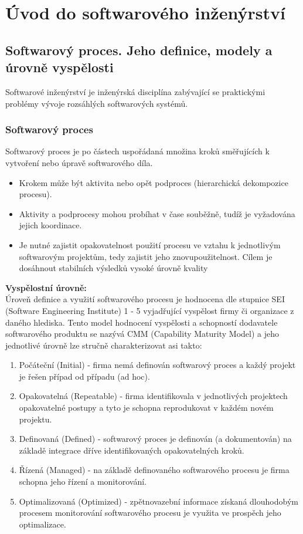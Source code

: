 \section{Úvod do softwarového inženýrství}
\subsection{Softwarový proces. Jeho definice, modely a úrovně vyspělosti}
Softwarové inženýrství je inženýrská disciplína zabývající se praktickými problémy vývoje rozsáhlých softwarových systémů.

\subsubsection{Softwarový proces}
Softwarový proces je po částech uspořádaná množina kroků směřujících k vytvoření nebo úpravě softwarového díla.
\begin{itemize}
\item Krokem může být aktivita nebo opět podproces (hierarchická dekompozice procesu). 
\item Aktivity a podprocesy mohou probíhat v čase souběžně, tudíž je vyžadována jejich koordinace. 
\item Je nutné zajistit opakovatelnost použití procesu ve vztahu k jednotlivým softwarovým projektům, tedy zajistit jeho znovupoužitelnost.  Cílem je dosáhnout stabilních výsledků vysoké úrovně kvality
\end{itemize}

\textbf{Vyspělostní úrovně:}\\
Úroveň definice a využití softwarového procesu je hodnocena dle stupnice SEI (Software Engineering Institute) 1 - 5 vyjadřující vyspělost firmy či organizace z daného hlediska. Tento model hodnocení vyspělosti a schopností dodavatele softwarového produktu se nazývá CMM (Capability Maturity Model) a jeho jednotlivé úrovně lze stručně charakterizovat asi takto:
\begin{enumerate}
\item Počáteční (Initial) - firma nemá definován softwarový proces a každý projekt je řešen případ od případu (ad hoc).
\item Opakovatelná (Repeatable) - firma identifikovala v jednotlivých projektech opakovatelné postupy a tyto je schopna reprodukovat v každém novém projektu.
\item Definovaná (Defined) - softwarový proces je definován (a dokumentován) na základě integrace dříve identifikovaných opakovatelných kroků.
\item Řízená (Managed) - na základě definovaného softwarového procesu je firma schopna jeho řízení a monitorování.
\item Optimalizovaná (Optimized) - zpětnovazební informace získaná dlouhodobým procesem monitorování softwarového procesu je využita ve prospěch jeho optimalizace.
\end{enumerate}

